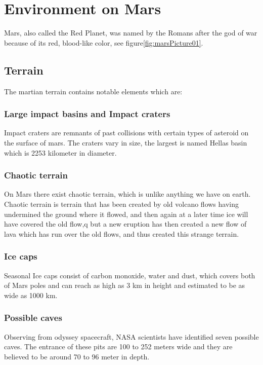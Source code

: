 \chapter{Environment on Mars}\label{ch:environmentOnMars}

Mars, also called the Red Planet, was named by the Romans after the god of war because of its red, blood-like color, see figure\ref{fig:marsPicture01}. 

\section{Terrain} 
The martian terrain contains notable elements which are:

\subsection{Large impact basins and Impact craters}%
Impact craters are remnants of past collisions with certain types of asteroid on the surface of mars. The craters vary in size, the largest is named Hellas basin which is 2253 kilometer in diameter.

\subsection{Chaotic terrain}
On Mars there exist chaotic terrain, which is unlike anything we have on earth.\\
Chaotic terrain is terrain that has been created by old volcano flows having undermined the ground where it flowed, and then again at a later time ice will have covered the old flow,q but a new eruption has then created a new flow of lava which has run over the old flows, and thus created this strange terrain\cite{CTerrain}.

\subsection{Ice caps}
Seasonal Ice caps consist of carbon monoxide, water and dust, which covers both of Mars poles and can reach as high as 3 km in height and estimated to be as wide as 1000 km.

\subsection{Possible caves}
Observing from odyssey spacecraft, NASA scientists have identified seven possible caves. The entrance of these pits are 100 to 252 meters wide and they are believed to be around 70 to 96 meter in depth\cite{surface}\cite{guide}.

